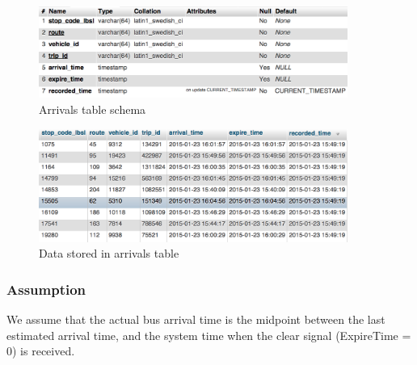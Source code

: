 \begin{figure}
\centering
\includegraphics[width=0.9\textwidth]{figures/arrivals_schema.png}
\caption{\label{fig:arrivals_schema} Arrivals table schema }
\end{figure}

\begin{figure}
\centering
\includegraphics[width=0.9\textwidth]{figures/arrivals_view.png}
\caption{\label{fig:arrivals_view} Data stored in arrivals table}
\end{figure}


\subsubsection{Assumption}
We assume that the actual bus arrival time is the midpoint between the last estimated arrival time, and the system time when the clear signal (ExpireTime = 0) is received.


